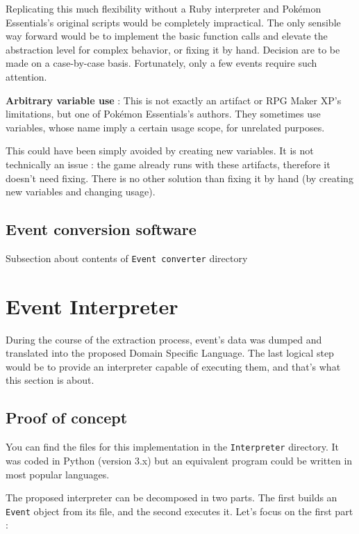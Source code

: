 \documentclass[11pt]{article}
\begin{document}
{Replicating this much flexibility without a Ruby interpreter and Pokémon Essentials's original scripts would be completely impractical. The only sensible way forward would be to implement the basic function calls and elevate the abstraction level for complex behavior, or fixing it by hand. Decision are to be made on a case-by-case basis. Fortunately, only a few events require such attention.

\textbf{Arbitrary variable use} : This is not exactly an artifact or RPG Maker XP's limitations, but one of Pokémon Essentials's authors. They sometimes use variables,  whose name imply a certain usage scope, for unrelated purposes. 

This could have been simply avoided by creating new variables. It is not technically an issue : the game already runs with these artifacts, therefore it doesn't need fixing. There is no other solution than fixing it by hand (by creating new variables and changing usage).




\subsection{Event conversion software}

Subsection about contents of \texttt{Event converter} directory




\newpage 
\section{Event Interpreter}


During the course of the extraction process, event's data was dumped and translated into the proposed Domain Specific Language. The last logical step would be to provide an interpreter capable of executing them, and that's what this section is about.

\subsection{Proof of concept}

You can find the files for this implementation in the \texttt{Interpreter} directory. It was coded in Python (version 3.x) but an equivalent program could be written in most popular languages.

The proposed interpreter can be decomposed in two parts. The first builds an \texttt{Event} object from its file, and the second executes it. Let's focus on the first part :

}
\end{document}
